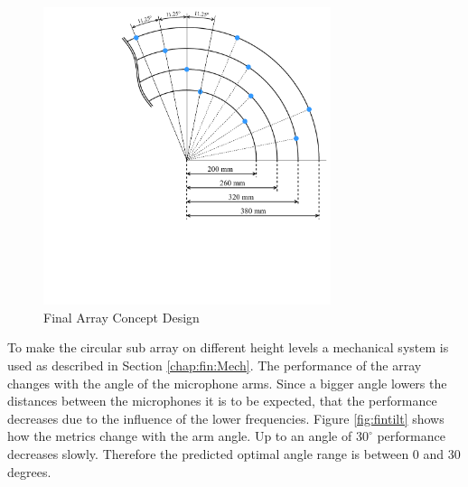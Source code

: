 \begin{figure}[h]
	\centering
	\includegraphics[width=0.75\textwidth, trim={5.5cm 6.0cm 0 0}]{images/5_array_evaluation/final_array_concept_design.pdf}
	\caption{Final Array Concept Design}
	\label{fig:final_array_concept_design}
\end{figure}


To make the circular sub array on different height levels
a mechanical system is used as described in Section \ref{chap:fin:Mech}.
The performance of the array changes with the angle of the microphone arms.
Since a bigger angle lowers the distances between the microphones it is to be
expected, that the performance decreases due to the influence of the lower frequencies.
Figure \ref*{fig:fintilt} shows how the metrics change with the arm angle.
Up to an angle of $30^\circ$ performance decreases slowly.
Therefore the predicted optimal angle range is between 0 and 30 degrees.

